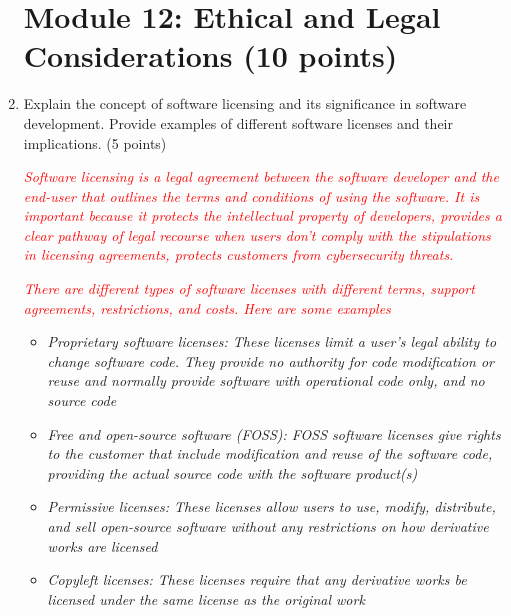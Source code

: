 \documentclass{article}
\begin{document}
\begin{enumerate}
             \section{Module 12: Ethical and Legal Considerations (10
             points)}
             \item Explain the concept of software licensing and its significance in software
             development. Provide examples of different software licenses and their
             implications. (5 points)\par
             \textcolor{red}{\textit{Software licensing is a legal agreement between the software developer and the end-user that outlines the 
             terms and conditions of using the software. It is important because it protects the intellectual property of developers, 
             provides a clear pathway of legal recourse when users don’t comply with the stipulations in licensing agreements, 
             protects customers from cybersecurity threats.}}\par
             \textcolor{red}{\textit{There are different types of software licenses with different terms, 
             support agreements, restrictions, and costs. Here are some examples}}
             \begin{itemize}
                \color{red}
                \item \textit{Proprietary software licenses: These licenses limit a user’s legal ability to change software code. 
                They provide no authority for code modification or reuse and normally provide software with operational code only, 
                and no source code}
                \item \textit{Free and open-source software (FOSS): FOSS software licenses give rights to the customer that include 
                modification and reuse of the software code, providing the actual source code with the software product(s)}
                \item \textit{Permissive licenses: These licenses allow users to use, modify, distribute, and sell open-source 
                software without any restrictions on how derivative works are licensed}
                \item \textit{Copyleft licenses: These licenses require that any derivative works be licensed under the same 
                license as the original work}
             \end{itemize}


\end{enumerate}
\end{document}
